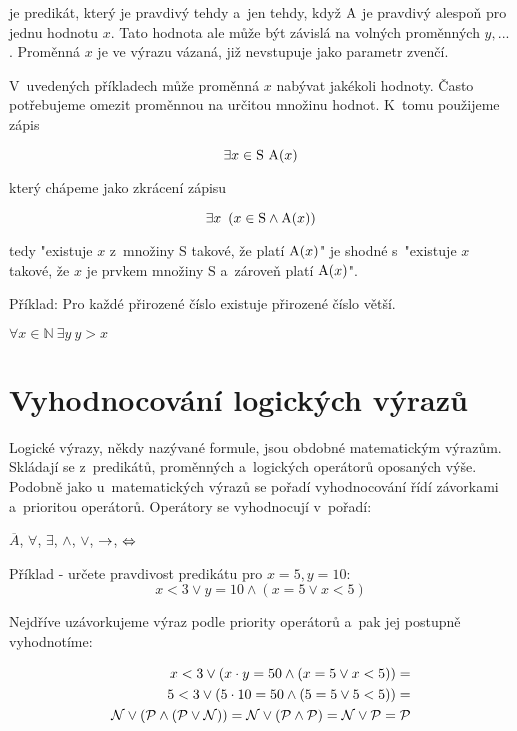 je predikát, který je pravdivý tehdy a~jen tehdy, když \(\mathrm{A}\) je pravdivý alespoň pro jednu hodnotu \(x\). Tato hodnota ale může být závislá na volných proměnných \(y, ...\). Proměnná \(x\) je ve výrazu vázaná, již nevstupuje jako parametr zvenčí.

V~uvedených příkladech může proměnná \(x\) nabývat jakékoli hodnoty. Často potřebujeme omezit proměnnou na určitou množinu hodnot. K~tomu použijeme zápis

\begin{equation}
\exists x \in \mathrm{S} \ \predicate{A}(x)
\end{equation}

který chápeme jako zkrácení zápisu

\begin{equation}
\exists x \ \left( x \in \mathrm{S} \land \mathrm{A}(x) \right)
\end{equation}

tedy "existuje \(x\) z~množiny \(\mathrm{S}\) takové, že platí \(\mathrm{A}(x)\)" je shodné s~"existuje \(x\) takové, že \(x\) je prvkem množiny \(\mathrm{S}\) a~zároveň platí \(\mathrm{A}(x)\)".

Příklad: Pro každé přirozené číslo existuje přirozené číslo větší. 

\(\forall x \in \mathbb{N} \ \exists y \ y > x\)

\section{Vyhodnocování logických výrazů}

Logické výrazy, někdy nazývané formule, jsou obdobné matematickým výrazům. Skládají se z~predikátů, proměnných a~logických operátorů oposaných výše. Podobně jako u~matematických výrazů se pořadí vyhodnocování řídí závorkami a~prioritou operátorů. Operátory se vyhodnocují v~pořadí:

\(\overline{A}\), \(\forall\), \(\exists\), \(\land\), \(\lor\), \(\rightarrow\), \(\Leftrightarrow\)

Příklad - určete pravdivost predikátu pro \(x = 5, y = 10\):
\begin{equation}
x < 3 \lor y = 10 \land (x = 5 \lor x < 5)
\end{equation}

Nejdříve uzávorkujeme výraz podle priority operátorů a~pak jej postupně vyhodnotíme:

\begin{equation}
\begin{split}
x < 3 \lor (x \cdot y = 50 \land (x = 5 \lor x < 5)) = \\
5 < 3 \lor (5 \cdot 10 = 50 \land (5 = 5 \lor 5 < 5)) = \\
\mathcal{N} \lor (\mathcal{P} \land (\mathcal{P} \lor \mathcal{N})) = \mathcal{N} \lor (\mathcal{P} \land \mathcal{P}) = \mathcal{N} \lor \mathcal{P} = \mathcal{P} 
\end{split}
\end{equation}


